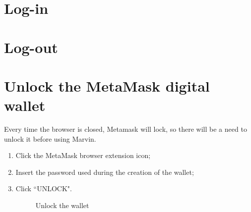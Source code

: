 \documentclass[ManualeUtente]{subfiles}
\begin{document}
\section{Log-in}

\section{Log-out}

\section{Unlock the MetaMask digital wallet}
Every time the browser is closed, Metamask will lock, so there will be a need to unlock it before using Marvin.
\begin{enumerate}
	\item Click the MetaMask browser extension icon;
	\item Insert the password used during the creation of the wallet;
	\item Click \textquotedblleft UNLOCK".
	\begin{figure}[H]
		\centering
		\caption{Unlock the wallet}
		\label{fig:Unlock the wallet}
	\end{figure}
\end{enumerate}
\end{document}
